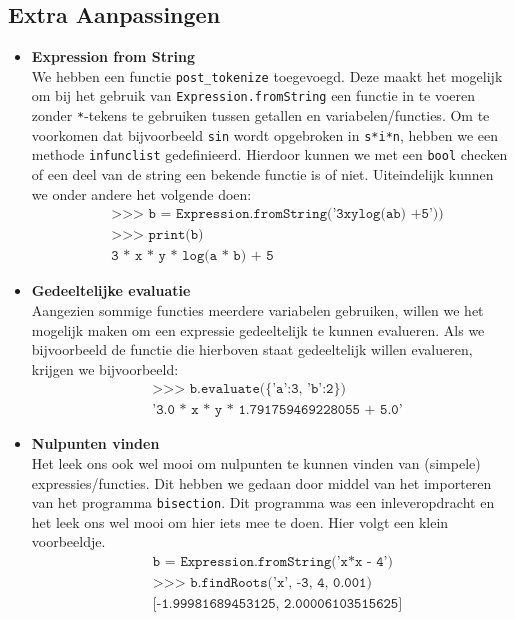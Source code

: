\documentclass[12pt]{article}
\begin{document}
\subsection*{Extra Aanpassingen}
\begin{itemize}
\item \textbf{Expression from String}\\
We hebben een functie \texttt{post\_tokenize} toegevoegd. Deze maakt het mogelijk om bij het gebruik van \texttt{Expression.fromString} een functie in te voeren zonder \texttt{*}-tekens te gebruiken tussen getallen en variabelen/functies. Om te voorkomen dat bijvoorbeeld \texttt{sin} wordt opgebroken in \texttt{s*i*n}, hebben we een methode \texttt{infunclist} gedefinieerd. Hierdoor kunnen we met een \texttt{bool} checken of een deel van de string een bekende functie is of niet. Uiteindelijk kunnen we onder andere het volgende doen:
\begin{align*}
&\texttt{>>> b = Expression.fromString('3xylog(ab) +5'))}\\
&\texttt{>>> print(b)}\\
&\texttt{3 * x * y * log(a * b) + 5}
\end{align*}

\item \textbf{Gedeeltelijke evaluatie}\\
Aangezien sommige functies meerdere variabelen gebruiken, willen we het mogelijk maken om een expressie gedeeltelijk te kunnen evalueren. Als we bijvoorbeeld de functie die hierboven staat gedeeltelijk willen evalueren, krijgen we bijvoorbeeld:
\begin{align*}
&\texttt{>>> b.evaluate(\{'a':3, 'b':2\})}\\
&\texttt{'3.0 * x * y * 1.791759469228055 + 5.0'}
\end{align*}

\item \textbf{Nulpunten vinden}\\
Het leek ons ook wel mooi om nulpunten te kunnen vinden van (simpele) expressies/functies. Dit hebben we gedaan door middel van het importeren van het programma \texttt{bisection}. Dit programma was een inleveropdracht en het leek ons wel mooi om hier iets mee te doen. Hier volgt een klein voorbeeldje.
\begin{align*}
&\texttt{b = Expression.fromString('x*x - 4')}\\
&\texttt{>>> b.findRoots('x', -3, 4, 0.001)}\\
&\texttt{[-1.99981689453125, 2.00006103515625]}
\end{align*}


\end{itemize}
\end{document}
